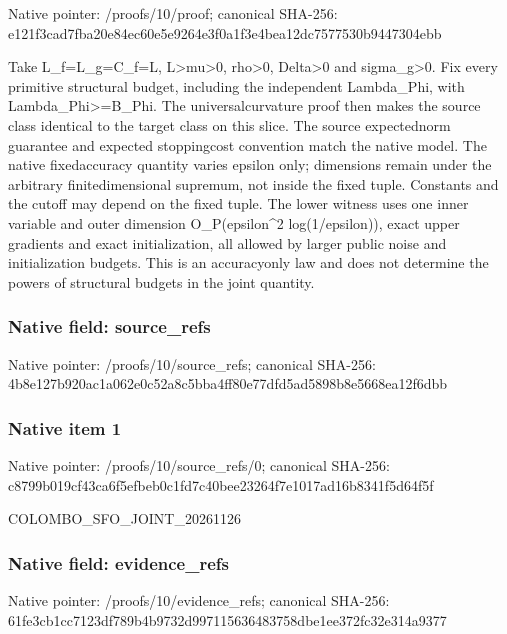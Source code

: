 \documentclass[10pt,a4paper]{article}
\begin{document}
Native pointer: /proofs/10/proof; canonical SHA-256: e121f3cad7fba20e84ec60e5\allowbreak{}e9264e3f0a1f3e4bea12dc75\allowbreak{}77530b9447304ebb


Take L\_f=L\_g=C\_f=L, L>mu>0, rho>0, Delta>0 and sigma\_g>0. Fix every primitive structural budget, including the independent Lambda\_Phi, with Lambda\_Phi>=B\_Phi. The universalcurvature proof then makes the source class identical to the target class on this slice. The source expectednorm guarantee and expected stoppingcost convention match the native model. The native fixedaccuracy quantity varies epsilon only; dimensions remain under the arbitrary finitedimensional supremum, not inside the fixed tuple. Constants and the cutoff may depend on the fixed tuple. The lower witness uses one inner variable and outer dimension O\_P(epsilon\textasciicircum{}2 log(1/epsilon)), exact upper gradients and exact initialization, all allowed by larger public noise and initialization budgets. This is an accuracyonly law and does not determine the powers of structural budgets in the joint quantity.


\subsubsection{Native field: source\_refs}


Native pointer: /proofs/10/source\_refs; canonical SHA-256: 4b8e127b920ac1a062e0c52a\allowbreak{}8c5bba4ff80e77dfd5ad5898\allowbreak{}b8e5668ea12f6dbb



\subsubsection{Native item 1}


Native pointer: /proofs/10/source\_refs/0; canonical SHA-256: c8799b019cf43ca6f5efbeb0\allowbreak{}c1fd7c40bee23264f7e1017a\allowbreak{}d16b8341f5d64f5f


COLOMBO\_SFO\_JOINT\_20261126


\subsubsection{Native field: evidence\_refs}


Native pointer: /proofs/10/evidence\_refs; canonical SHA-256: 61fe3cb1cc7123df789b4b97\allowbreak{}32d997115636483758dbe1ee\allowbreak{}372fc32e314a9377
\end{document}
